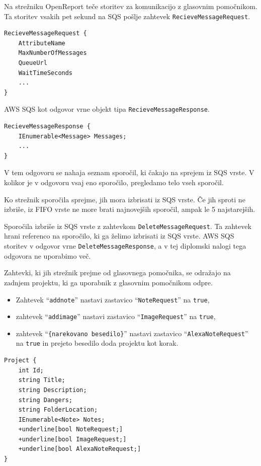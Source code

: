 \documentclass[a4paper, 12pt]{book}
\begin{document}
Na strežniku OpenReport teče storitev za komunikacijo z glasovnim pomočnikom.
Ta storitev vsakih pet sekund na SQS pošlje zahtevek \texttt{RecieveMessageRequest}.

\begin{Verbatim}[commandchars=+\[\]]
RecieveMessageRequest {
    AttributeName 
    MaxNumberOfMessages 
    QueueUrl 
    WaitTimeSeconds
    ... 
} 
\end{Verbatim}

AWS SQS kot odgovor vrne objekt tipa \texttt{RecieveMessageResponse}.

\begin{Verbatim}[commandchars=+\[\]]
RecieveMessageResponse {
    IEnumerable<Message> Messages;
    ...
}
\end{Verbatim}

V tem odgovoru se nahaja seznam sporočil, ki čakajo na sprejem iz SQS vrste.
V kolikor je v odgovoru vsaj eno sporočilo, pregledamo telo vseh sporočil. 

Ko strežnik sporočila sprejme, jih mora izbrisati iz SQS vrste.
Če jih sproti ne izbriše, iz FIFO vrste ne more brati najnovejših sporočil, ampak le 5 najstarejših.

Sporočila izbriše iz SQS vrste z zahtevkom \texttt{DeleteMessageRequest}.
Ta zahtevek hrani referenco na sporočilo, ki ga želimo izbrisati iz SQS vrste.
AWS SQS storitev v odgovor vrne \texttt{DeleteMessageResponse}, a v tej diplomski nalogi tega odgovora ne uporabimo več.

Zahtevki, ki jih strežnik prejme od glasovnega pomočnika, se odražajo na zadnjem projektu, ki ga uporabnik z glasovnim pomočnikom odpre.
\begin{itemize}
	\item Zahtevek \enquote{\texttt{addnote}} nastavi zastavico \enquote{\texttt{NoteRequest}} na \texttt{true},
	\item zahtevek \enquote{\texttt{addimage}} nastavi zastavico \enquote{\texttt{ImageRequest}} na \texttt{true},
	\item zahtevek \enquote{\texttt{\{narekovano besedilo\}}} nastavi zastavico \enquote{\texttt{AlexaNoteRequest}} na \texttt{true} in prejeto besedilo doda projektu kot korak.
\end{itemize}

\begin{Verbatim}[commandchars=+\[\]]
Project { 
    int Id; 
    string Title; 
    string Description; 
    string Dangers; 
    string FolderLocation; 
    IEnumerable<Note> Notes; 
    +underline[bool NoteRequest;] 
    +underline[bool ImageRequest;] 
    +underline[bool AlexaNoteRequest;] 
}
\end{Verbatim}
\end{document}

